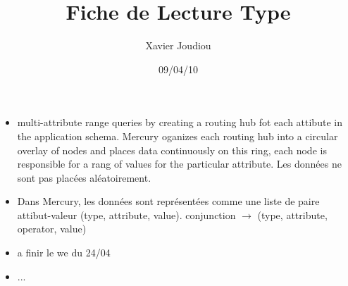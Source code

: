 \documentclass[11pt,a4paper]{article}
\title{Fiche de Lecture Type}
\author{Xavier Joudiou}
\date{09/04/10}
\begin{document}
	
  \begin{itemize}
  \renewcommand{\labelitemi}{$\Rightarrow$}
	\item multi-attribute range queries by creating a routing hub fot each attibute in the application schema. Mercury oganizes each routing hub into a circular overlay of nodes and places data continuously on this ring, each node is responsible for a rang of values for the particular attribute. Les données ne sont pas placées aléatoirement. 
	\item Dans Mercury, les données sont représentées comme une liste de paire attibut-valeur (type, attribute, value). conjunction $\rightarrow$ (type, attribute, operator, value)
	\item a finir le we du 24/04 
	\item ...
  \end{itemize}
\end{document}
